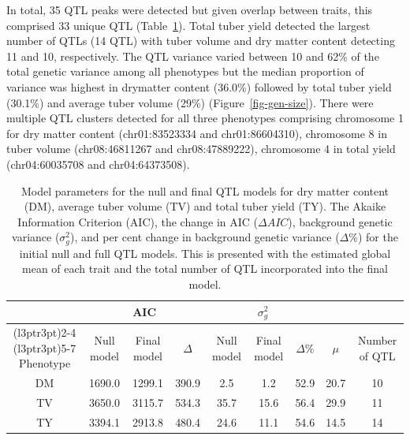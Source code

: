 \begin{refsection}
In total, 35 QTL peaks were detected but given overlap between traits,
this comprised 33 unique QTL (Table~\ref{tbl-summary}). Total tuber
yield detected the largest number of QTLs (14 QTL) with tuber volume and
dry matter content detecting 11 and 10, respectively. The QTL variance
varied between 10 and 62\% of the total genetic variance among all
phenotypes but the median proportion of variance was highest in
drymatter content (36.0\%) followed by total tuber yield (30.1\%) and
average tuber volume (29\%) (Figure~\ref{fig-gen-size}). There were multiple QTL clusters detected for all three phenotypes comprising chromosome 1 for
dry matter content (chr01:83523334 and chr01:86604310), chromosome 8 in
tuber volume (chr08:46811267 and chr08:47889222), chromosome 4 in total
yield (chr04:60035708 and chr04:64373508).

\begin{landscape}
\begin{table}
\caption{\label{tbl-summary}Model parameters for the null and final QTL models for dry matter
content (DM), average tuber volume (TV) and total tuber yield (TY). The
Akaike Information Criterion (AIC), the change in AIC (\(\Delta AIC\)),
background genetic variance (\(\sigma^2_g\)), and per cent change in
background genetic variance (\(\Delta \% \)) for the initial
null and full QTL models. This is presented with the estimated global
mean of each trait and the total number of QTL incorporated into the
final model. }\tabularnewline

\centering
\begin{tabular}{ccccccccc}
\toprule
\multicolumn{1}{c}{ } & \multicolumn{3}{c}{AIC} & \multicolumn{3}{c}{$\sigma^2_g$} & \multicolumn{2}{c}{ } \\
\cmidrule(l{3pt}r{3pt}){2-4} \cmidrule(l{3pt}r{3pt}){5-7}
Phenotype & Null model & Final model & $\Delta$ & Null model & Final model & $\Delta\%$ & $\mu$ & Number of
QTL\\
\midrule
DM & 1690.0 & 1299.1 & 390.9 & 2.5 & 1.2 & 52.9 & 20.7 & 10\\
TV & 3650.0 & 3115.7 & 534.3 & 35.7 & 15.6 & 56.4 & 29.9 & 11\\
TY & 3394.1 & 2913.8 & 480.4 & 24.6 & 11.1 & 54.6 & 14.5 & 14\\
\bottomrule
\end{tabular}
\end{table}
\end{landscape}

\begin{landscape}
\begin{figure}


\end{figure}
\end{landscape}
\end{refsection}
